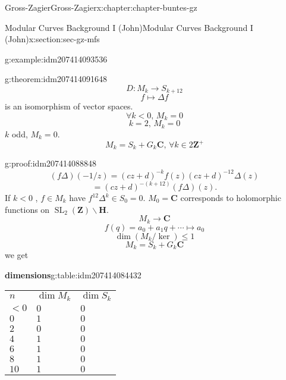 \documentclass[oneside,10pt,]{book}
\numberwithin{equation}{section}
\newcommand{\ZZ}{\mathbf{Z}}
\newcommand{\CC}{\mathbf{C}}
\newcommand{\HH}{\mathbf{H}}
\DeclareMathOperator{\SL}{SL}
\newcommand{\lt}{<}
\begin{document}
\begin{chapterptx}{Gross-Zagier}{}{Gross-Zagier}{}{}{x:chapter:chapter-buntes-gz}
\begin{sectionptx}{Modular Curves Background I (John)}{}{Modular Curves Background I (John)}{}{}{x:section:sec-gz-mfs}
\begin{example}{}{g:example:idm207414093536}
\end{example}
\begin{theorem}{}{}{g:theorem:idm207414091648}%
%
\begin{equation*}
D\colon M_k \to S_{k+12}
\end{equation*}
%
\begin{equation*}
f\mapsto \Delta f
\end{equation*}
is an isomorphism of vector spaces.%
\begin{equation*}
\forall k \lt  0,\, M_k = 0
\end{equation*}
%
\begin{equation*}
k=2,\, M_k = 0
\end{equation*}
\(k\) odd, \(M_k = 0\).%
\begin{equation*}
M_k = S_k + G_k \CC,\,\forall k \in 2\ZZ^+
\end{equation*}
%
\end{theorem}
\begin{proofptx}{}{g:proof:idm207414088848}
%
\begin{equation*}
(f\Delta) (-1/z) = (cz+d)^{-k}f(z) (cz+d)^{-12} \Delta (z)
\end{equation*}
%
\begin{equation*}
= (cz+d)^{-(k+12)}(f\Delta ) (z)\text{.}
\end{equation*}
If \(k \lt  0\) , \(f \in M_k\) have \(f^{12}\Delta ^k \in S_0 = 0\). \(M_0 =\CC\) corresponds to holomorphic functions on \(\SL_2(\ZZ) \backslash \HH\).%
\begin{equation*}
M_k \to \CC
\end{equation*}
%
\begin{equation*}
f(q) = a_0  + a_1 q + \cdots \mapsto a_0
\end{equation*}
%
\begin{equation*}
\dim(M_k / \ker) \le 1
\end{equation*}
%
\begin{equation*}
M_k = S_k + G_k \CC
\end{equation*}
we get%
\begin{tableptx}{\textbf{dimensions}}{g:table:idm207414084432}{}%
\centering
\begin{tabular}{lll}
\(n\)&\(\dim M_k\)&\(\dim S_k\)\tabularnewline[0pt]
\(\lt 0\)&\(0\)&\(0\)\tabularnewline[0pt]
\(0\)&\(1\)&\(0\)\tabularnewline[0pt]
\(2\)&\(0\)&\(0\)\tabularnewline[0pt]
\(4\)&\(1\)&\(0\)\tabularnewline[0pt]
\(6\)&\(1\)&\(0\)\tabularnewline[0pt]
\(8\)&\(1\)&\(0\)\tabularnewline[0pt]
\(10\)&\(1\)&\(0\)\tabularnewline[0pt]

\end{tabular}
\end{tableptx}
\end{proofptx}
\end{sectionptx}
\end{chapterptx}
\end{document}
